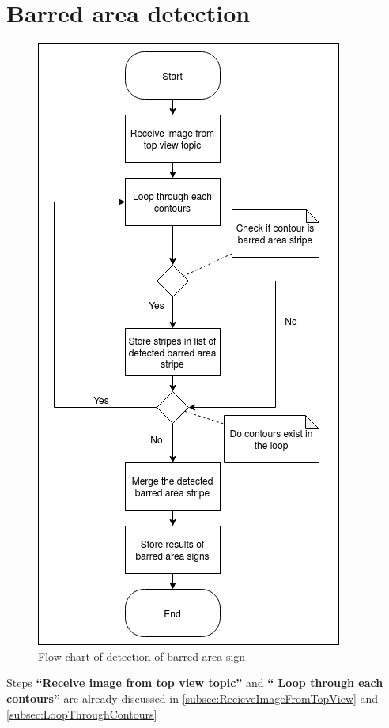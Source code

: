 \section{Barred area detection}
\begin{figure}[h]
    \centering
    \includegraphics[scale=0.44]{images/BarredAreaFlowChart.png}
    \caption{Flow chart of detection of barred area sign}
\end{figure}

Steps \textbf{``Receive image from top view topic''} and \textbf{`` Loop through each contours''} are already discussed in \autoref{subsec:RecieveImageFromTopView} and \autoref{subsec:LoopThroughContours}

